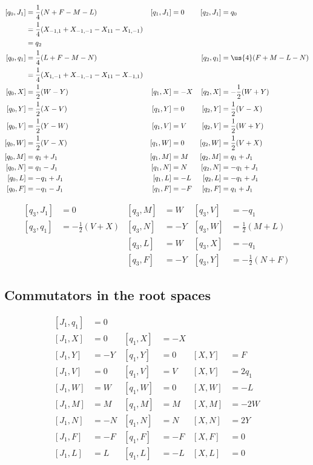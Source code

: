 \begin{subequations}
\begin{align}
[q_0,J_1]	&=\frac{1}{4}(N+F-M-L)					&[q_1,J_1]&=0	&[q_2,J_1]&=q_0\\
		&=\frac{1}{ 4 }(X_{-1,1}+X_{-1,-1}-X_{11}-X_{1,-1})					\\
		&=q_2\\
[q_0,q_1]	&=\frac{1}{4}(L+F-M-N)&       				&    &[q_2,q_1]&=\us{4}(F+M-L-N)\\
		&=\frac{ 1 }{ 4 }(X_{1,-1}+X_{-1,-1}-X_{11}-X_{-1,1})\\
[q_0,X]  &=\frac{1}{2}(W-Y)          &[q_1,X]  &=-X &[q_2,X]&=-\frac{1}{2}(W+Y)\\
[q_0,Y]  &=\frac{1}{2}(X-V)          &[q_1,Y]  &=0  &[q_2,Y]&=\frac{1}{2}(V-X)\\
[q_0,V]  &=\frac{1}{2}(Y-W)          &[q_1,V]  &=V  &[q_2,V]&=\frac{1}{2}(W+Y)\\
[q_0,W]  &=\frac{1}{2}(V-X)          &[q_1,W]  &=0  &[q_2,W]&=\frac{1}{2}(V+X)\\
[q_0,M]  &=q_1+J_1             &[q_1,M]  &=M  &[q_2,M]&=q_1+J_1\\
[q_0,N]  &=q_1-J_1             &[q_1,N]  &=N  &[q_2,N]&=-q_1+J_1\\
[q_0,L]  &=-q_1+J_1            &[q_1,L]  &=-L &[q_2,L]&=-q_1+J_1\\
[q_0,F]  &=-q_1-J_1            &[q_1,F]  &=-F &[q_2,F]&=q_1+J_1
\end{align}
\end{subequations}

\begin{subequations}
\begin{align}
 [q_3,J_1]&=0           &[q_3,M]&=W   &[q_3,V]&=-q_1\\
 [q_3,q_1]&=-\frac{1}{2}(V+X) &[q_3,N]&=-Y  &[q_3,W]&=\frac{1}{2}(M+L)\\
          &             &[q_3,L]&=W   &[q_3,X]&=-q_1\\
          &             &[q_3,F]&=-Y  &[q_3,Y]&=-\frac{1}{2}(N+F)
\end{align}
\end{subequations}

\subsection{Commutators in the root spaces}

\begin{subequations}
\begin{align}
[J_1,q_1]&=0\\
[J_1,X]&=0&[q_1,X]&=-X\\
[J_1,Y]&=-Y&[q_1,Y]&=0&[X,Y]&=F\\
[J_1,V]&=0&[q_1,V]&=V&[X,V]&=2q_1\\
[J_1,W]&=W&[q_1,W]&=0&[X,W]&=-L\\
[J_1,M]&=M&[q_1,M]&=M&[X,M]&=-2W\\
[J_1,N]&=-N&[q_1,N]&=N&[X,N]&=2Y\\
[J_1,F]&=-F&[q_1,F]&=-F&[X,F]&=0\\
[J_1,L]&=L&[q_1,L]&=-L&[X,L]&=0
\end{align}
\end{subequations}

